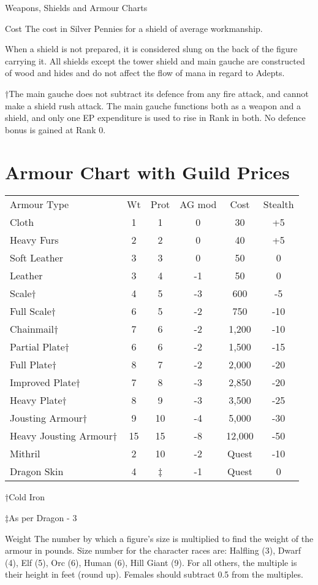 \begin{Tables}{Weapons, Shields and Armour Charts}
 
Cost The cost in Silver Pennies for a shield of average workmanship.
 

When a shield is not prepared, it is considered slung on the back of
the figure carrying it.  All shields except the tower shield and main
gauche are constructed of wood and hides and do not affect the flow of
mana in regard to Adepts.

†The main gauche does not subtract its defence from any fire attack,
and cannot make a shield rush attack. The main gauche functions both
as a weapon and a shield, and only one EP expenditure is used to rise
in Rank in both.  No defence bonus is gained at Rank 0.


\section{Armour Chart with Guild Prices}

 
\begin{tabularx}{\linewidth}{Xccccc}
Armour Type		& Wt	& Prot	& AG mod& Cost	& Stealth \\ 
Cloth			& 1	& 1	& 0	& 30	& +5 \\
Heavy Furs		& 2	& 2	& 0	& 40	& +5 \\
Soft Leather		& 3	& 3	& 0	& 50	& 0 \\
Leather			& 3	& 4	& -1	& 50	& 0 \\
Scale†			& 4	& 5	& -3	& 600	& -5 \\
Full Scale†		& 6	& 5	& -2	& 750	& -10 \\
Chainmail†		& 7	& 6	& -2	& 1,200	& -10 \\
Partial Plate†		& 6	& 6	& -2	& 1,500	& -15 \\
Full Plate†		& 8	& 7	& -2	& 2,000	& -20 \\
Improved Plate†		& 7	& 8	& -3	& 2,850	& -20 \\
Heavy Plate†		& 8	& 9	& -3	& 3,500	& -25 \\
Jousting Armour†	& 9	& 10	& -4	& 5,000	& -30 \\
Heavy Jousting Armour†	& 15	& 15	& -8	& 12,000& -50 \\
Mithril			& 2	& 10	& -2	& Quest	& -10 \\
Dragon Skin		& 4	& ‡	& -1	& Quest	& 0 \\
\end{tabularx}

†Cold Iron  

‡As per Dragon - 3 

 
Weight The number by which a figure’s size is multiplied to find the
weight of the armour in pounds. Size number for the character races
are: Halfling (3), Dwarf (4), Elf (5), Orc (6), Human (6), Hill Giant
(9). For all others, the multiple is their height in feet (round up).
Females should subtract 0.5 from the multiples.


\end{Tables}
